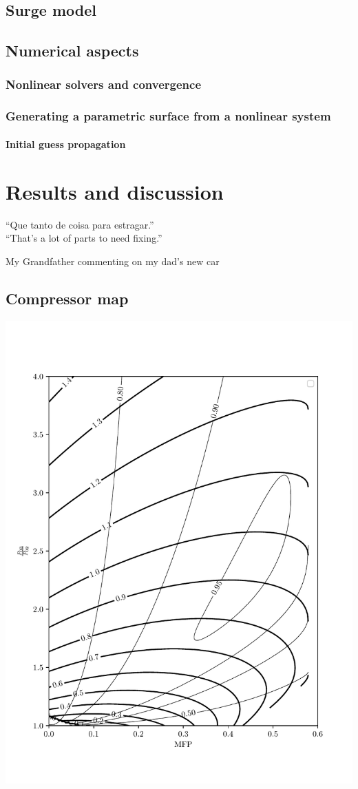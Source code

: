 \documentclass[tcc]{subfiles}
\begin{document}
\section{Surge model}
\section{Numerical aspects}
\subsection{Nonlinear solvers and convergence}
\subsection{Generating a parametric surface from a nonlinear system}
\subsubsection{Initial guess propagation}

\chapter{Results and discussion}
\epigraph{``Que tanto de coisa para estragar.''\\{\footnotesize ``That's a lot of parts to need fixing.}''}{My Grandfather commenting on my dad's new car}
\section{Compressor map}
\includegraphics{src/mapv1.pdf}
\end{document}

